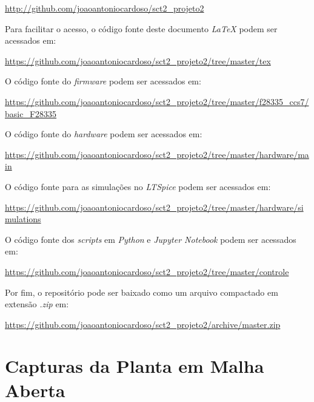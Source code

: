 \documentclass[
	12pt,				%
	article,			%
	openright,			%
	oneside,
	a4paper,			%
	chapter=TITLE,		%
	section=TITLE,		%
	english,			%
	french,				%
	spanish,			%
	brazil,				%
]{abntex2}
\begin{document}
\begin{apendicesenv}
            \url{http://github.com/joaoantoniocardoso/sct2_projeto2}
            
            Para facilitar o acesso, o código fonte deste documento \textit{LaTeX} podem ser acessados em:
            
            \url{https://github.com/joaoantoniocardoso/sct2_projeto2/tree/master/tex}
            
            O código fonte do \textit{firmware} podem ser acessados em:
            
            \url{https://github.com/joaoantoniocardoso/sct2_projeto2/tree/master/f28335_ccs7/basic_F28335}
            
            O código fonte do \textit{hardware} podem ser acessados em:
            
            \url{https://github.com/joaoantoniocardoso/sct2_projeto2/tree/master/hardware/main}
            
            O código fonte para as simulações no \textit{LTSpice} podem ser acessados em:
            
            \url{https://github.com/joaoantoniocardoso/sct2_projeto2/tree/master/hardware/simulations}
            
            
            O código fonte dos \textit{scripts} em \textit{Python} e \textit{Jupyter Notebook} podem ser acessados em:
            
            \url{https://github.com/joaoantoniocardoso/sct2_projeto2/tree/master/controle}
            
            Por fim, o repositório pode ser baixado como um arquivo compactado em extensão \textit{.zip} em:
            
            \url{https://github.com/joaoantoniocardoso/sct2_projeto2/archive/master.zip}
            
        \clearpage
	
        \chapter{Capturas da Planta em Malha Aberta}
        	\label{ap-ftma}
        	

\end{apendicesenv}
\end{document}
